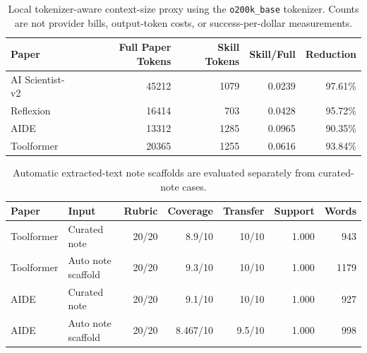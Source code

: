 
\begin{table}[t]
\centering
\caption{Local tokenizer-aware context-size proxy using the \texttt{o200k\_base} tokenizer. Counts are not provider bills, output-token costs, or success-per-dollar measurements.}
\label{tab:cost-proxy}
\begin{tabular}{lrrrr}
\toprule
Paper & Full Paper Tokens & Skill Tokens & Skill/Full & Reduction \\
\midrule
AI Scientist-v2 & 45212 & 1079 & 0.0239 & 97.61\% \\
Reflexion & 16414 & 703 & 0.0428 & 95.72\% \\
AIDE & 13312 & 1285 & 0.0965 & 90.35\% \\
Toolformer & 20365 & 1255 & 0.0616 & 93.84\% \\
\bottomrule
\end{tabular}
\end{table}

\begin{table}[t]
\centering
\caption{Automatic extracted-text note scaffolds are evaluated separately from curated-note cases.}
\label{tab:auto-note}
\begin{tabular}{llrrrrr}
\toprule
Paper & Input & Rubric & Coverage & Transfer & Support & Words \\
\midrule
Toolformer & Curated note & 20/20 & 8.9/10 & 10/10 & 1.000 & 943 \\
Toolformer & Auto note scaffold & 20/20 & 9.3/10 & 10/10 & 1.000 & 1179 \\
AIDE & Curated note & 20/20 & 9.1/10 & 10/10 & 1.000 & 927 \\
AIDE & Auto note scaffold & 20/20 & 8.467/10 & 9.5/10 & 1.000 & 998 \\
\bottomrule
\end{tabular}
\end{table}
